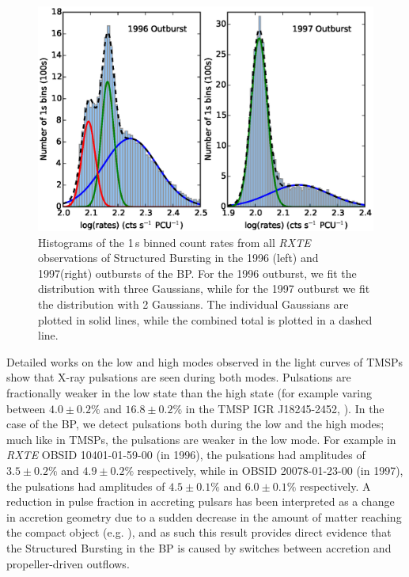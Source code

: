 \begin{figure}
 \centering
 \includegraphics[width=.82\linewidth, trim={1.3cm 0.1cm 1.7cm 1.1cm},clip]{images/hist_bo.eps}
 \caption[Histograms of the 1\,s binned count rates from all \textit{RXTE} observations of Structured Bursting in the 1996 and 1997 outbursts of the Bursting Pulsar.]{Histograms of the 1\,s binned count rates from all \textit{RXTE} observations of Structured Bursting in the 1996 (left) and 1997(right) outbursts of the BP. For the 1996 outburst, we fit the distribution with three Gaussians, while for the 1997 outburst we fit the distribution with 2 Gaussians. The individual Gaussians are plotted in solid lines, while the combined total is plotted in a dashed line.}
 \label{fig:bimodal}
\end{figure}

\par Detailed works on the low and high modes observed in the light curves of TMSPs show that X-ray pulsations are seen during both modes. Pulsations are fractionally weaker in the low state than the high state (for example varing between $4.0\pm0.2\%$ and $16.8\pm0.2\%$ in the TMSP IGR J18245-2452, \citealp{Ferrigno_TMSPVar}). In the case of the BP, we detect pulsations both during the low and the high modes; much like in TMSPs, the pulsations are weaker in the low mode. For example in \textit{RXTE} OBSID 10401-01-59-00 (in 1996), the pulsations had amplitudes of $3.5\pm0.2\%$ and $4.9\pm0.2\%$ respectively, while in OBSID 20078-01-23-00 (in 1997), the pulsations had amplitudes of $4.5\pm0.1\%$ and $6.0\pm0.1\%$ respectively. A reduction in pulse fraction in accreting pulsars has been interpreted as a change in accretion geometry due to a sudden decrease in the amount of matter reaching the compact object (e.g. \citealp{Ibragimov_PulseFrac}), and as such this result provides direct evidence that the Structured Bursting in the BP is caused by switches between accretion and propeller-driven outflows.

